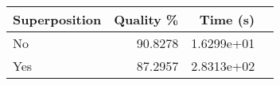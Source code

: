\begin{tabular}{lrrr}
    \hline
    Superposition & Quality \% & Time (s)   \\
    \hline
    No            & 90.8278    & 1.6299e+01 \\
    Yes           & 87.2957    & 2.8313e+02
    \hline
\end{tabular}